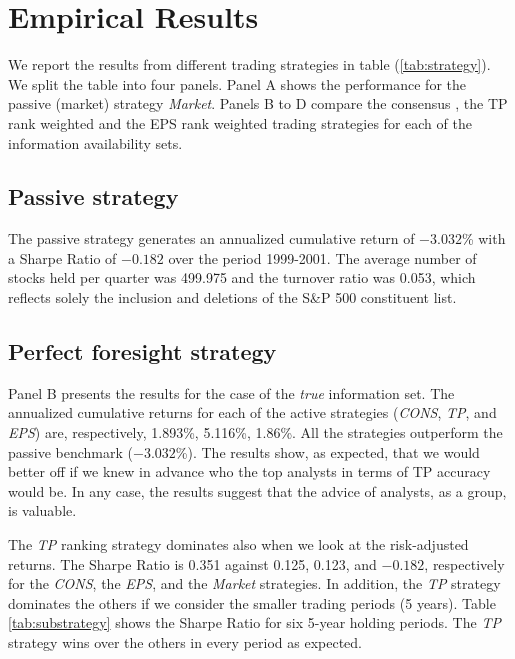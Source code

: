 \documentclass{article}\usepackage[]{graphicx}\usepackage[]{color}
\newcommand{\tr}{\textit{true}}
\begin{document}

\section{Empirical Results}
\label{sec:results}

We report the results from different trading strategies in table (\ref{tab:strategy}). We split the table into four panels. Panel A shows  the performance for  the passive (market) strategy \textit{Market}. Panels B to D compare the consensus , the TP rank weighted and the EPS rank weighted trading strategies for each of the information availability sets. 


\subsection{Passive strategy}

The passive strategy generates an annualized cumulative return of \ensuremath{-3.032}\% with a Sharpe Ratio  of \ensuremath{-0.182} over the period 1999-2001. The average number of stocks held per quarter was 499.975 and the turnover ratio was 0.053, which reflects solely the inclusion and deletions  of the S\&P 500 constituent list.

\subsection{Perfect foresight strategy}
\label{sec:perfect}
Panel B presents the results for the case of the \tr{} information set. The annualized cumulative returns for each of the active strategies (\textit{CONS}, \textit{TP}, and \textit{EPS}) are, respectively, 1.893\%, 5.116\%, 1.86\%. All the strategies outperform the passive benchmark (\ensuremath{-3.032}\%). The results show, as expected, that  we would better off if we knew in advance who the top analysts in terms of TP accuracy would be. In any case, the results suggest that the advice of analysts, as a group, is valuable. 


The \textit{TP} ranking strategy dominates also when we look at the risk-adjusted returns. The Sharpe Ratio is 0.351 against 0.125, 0.123, and \ensuremath{-0.182}, respectively for the \textit{CONS}, the \textit{EPS}, and the \textit{Market} strategies. In addition, the \textit{TP} strategy dominates  the others if we consider the smaller trading periods (5 years). Table \ref{tab:substrategy} shows the Sharpe Ratio for six 5-year holding periods. The \textit{TP} strategy wins over the others in every period as expected.
\end{document}
